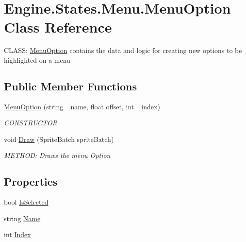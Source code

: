 \hypertarget{a00582}{}\section{Engine.\+States.\+Menu.\+Menu\+Option Class Reference}
\label{a00582}


C\+L\+A\+SS\+: \hyperlink{a00582}{Menu\+Option} contains the data and logic for creating new options to be highlighted on a menu  


\subsection*{Public Member Functions}
\begin{DoxyCompactItemize}
\item 
\hyperlink{a00582_a4a2c68f6b84495780f1cd0b716458204}{Menu\+Option} (string \+\_\+name, float offset, int \+\_\+index)
\begin{DoxyCompactList}\small\item\em C\+O\+N\+S\+T\+R\+U\+C\+T\+OR \end{DoxyCompactList}\item 
void \hyperlink{a00582_a824068f71d00483a40dd293049e2a10f}{Draw} (Sprite\+Batch sprite\+Batch)
\begin{DoxyCompactList}\small\item\em M\+E\+T\+H\+OD\+: Draws the menu Option \end{DoxyCompactList}\end{DoxyCompactItemize}
\subsection*{Properties}
\begin{DoxyCompactItemize}
\item 
bool \hyperlink{a00582_ae71156b6308de01502ec3a6242d6aed2}{Is\+Selected}
\item 
string \hyperlink{a00582_ae1b8c3d46b2bb4efcffc3c5d95efe6f8}{Name}
\item 
int \hyperlink{a00582_a378ae17c1e26363dba73e2f5e691fa78}{Index}
\end{DoxyCompactItemize}


